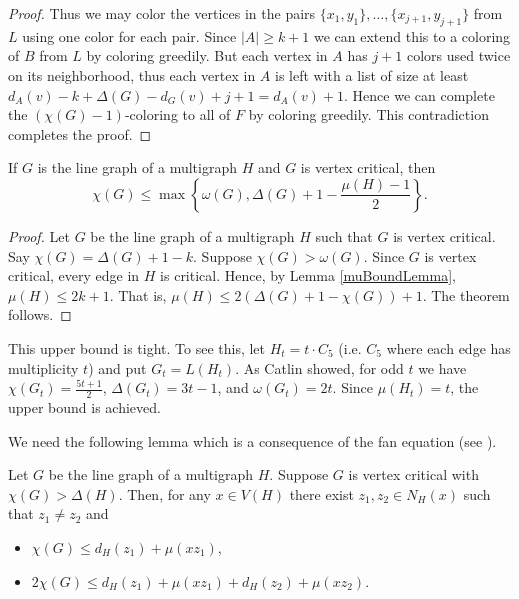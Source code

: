 \begin{proof}
Thus we may color the vertices in the pairs $\{x_1, y_1\}, \ldots, \{x_{j+1}, y_{j+1}\}$ from $L$ using one color for each pair.  Since $|A| \geq k + 1$ we can extend this to a coloring of $B$ from $L$ by coloring greedily.  But each vertex in $A$ has $j+1$ colors used twice on its neighborhood, thus each vertex in $A$ is left with a list of size at least $d_A(v) - k + \Delta(G) - d_G(v) + j + 1 = d_A(v) + 1$.  Hence we can complete the $(\chi(G) - 1)$-coloring to all of $F$ by coloring greedily.  This contradiction completes the proof.
\end{proof}

\begin{thm}\label{CriticalMuBound}
If $G$ is the line graph of a multigraph $H$ and $G$ is vertex critical, then
\[\chi(G) \leq \max\left\{\omega(G), \Delta(G) + 1 - \frac{\mu(H) - 1}{2}\right\}.\]
\end{thm}
\begin{proof}
Let $G$ be the line graph of a multigraph $H$ such that $G$ is vertex critical. Say $\chi(G) = \Delta(G) + 1 - k$.  Suppose $\chi(G) > \omega(G)$.  Since $G$ is vertex critical, every edge in $H$ is critical.  Hence, by Lemma \ref{muBoundLemma}, $\mu(H) \leq 2k+1$.  That is, $\mu(H) \leq 2(\Delta(G) + 1 - \chi(G)) + 1$.  The theorem follows.
\end{proof}

This upper bound is tight.  To see this, let $H_t = t \cdot C_5$ (i.e. $C_5$ where each edge has multiplicity $t$) and put $G_t = L(H_t)$.  As Catlin \cite{catlin1979hajos} showed, for odd $t$ we have $\chi(G_t) = \frac{5t + 1}{2}$, $\Delta(G_t) = 3t - 1$, and $\omega(G_t) = 2t$.  Since $\mu(H_t) = t$, the upper bound is achieved.

\noindent We need the following lemma which is a consequence of the fan equation (see \cite{anderson1977edge, cariolaro2006fans, StiebitzVizingGoldberg, GoldbergJGT}).
\begin{lem}\label{FanEquation}
Let $G$ be the line graph of a multigraph $H$.  Suppose $G$ is vertex critical with $\chi(G) > \Delta(H)$. Then, for any $x \in V(H)$ there exist $z_1, z_2 \in N_H(x)$ such that $z_1 \neq z_2$ and 
\begin{itemize}
\item $\chi(G) \leq d_H(z_1) + \mu(xz_1)$,
\item $2\chi(G) \leq d_H(z_1) + \mu(xz_1) + d_H(z_2) + \mu(xz_2)$.
\end{itemize}
\end{lem}

